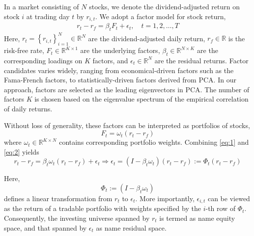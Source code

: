 \documentclass[12pt,article]{memoir}
\begin{document}
%
%
%
%
%
%
%


In a market consisting of $N$ stocks, we denote the dividend-adjusted return on stock $i$ at trading day $t$ by $r_{i, t}$. We adopt a factor model for stock return,
\begin{align}\label{eq:1}
r_t- r_f = \beta_t F_t+ \epsilon_t, \quad t=1,2, \ldots, T 
\end{align}
Here, $r_t=\left\{r_{i, t}\right\}_{i=1}^N \in \mathbb{R}^N$ are the dividend-adjusted daily return, $r_f \in \mathbb{R}$ is the risk-free rate, $F_t \in \mathbb{R}^{K \times 1}$ are the underlying factors, $\beta_t \in \mathbb{R}^{N \times K}$ are the corresponding loadings on $K$ factors, and $\epsilon_t \in \mathbb{R}^N$ are the residual returns. Factor candidates varies widely, ranging from economical-driven factors such as the Fama-French factors, to statistically-driven factors derived from PCA. In our approach, factors are selected as the leading eigenvectors in PCA. The number of factors $K$ is chosen based on the eigenvalue spectrum of the empirical correlation of daily returns.


Without loss of generality, these factors can be interpreted as portfolios of stocks,
\begin{equation}\label{eq:2}
	F_t=\omega_t\left(r_t-r_f\right)
\end{equation}
where $\omega_t \in \mathbb{R}^{K \times N}$ contains corresponding portfolio weights. Combining \cref{eq:1} and \cref{eq:2} yields
\begin{equation}\label{eq:3}
	r_t-r_f=\beta_t \omega_t\left(r_t-r_f\right)+\epsilon_t \Rightarrow \epsilon_t=\left(I-\beta_t \omega_t\right)\left(r_t-r_f\right):=\Phi_t\left(r_t-r_f\right)
\end{equation}

Here,
\begin{equation}\label{eq:4}
	\Phi_t:=\left(I-\beta_t \omega_t\right)
\end{equation}
defines a linear transformation from $r_t$ to $\epsilon_t$. More importantly, $\epsilon_{i, t}$ can be viewed as the return of a tradable portfolio with weights specified by the $i$-th row of $\Phi_t$. Consequently, the investing universe spanned by $r_t$ is termed as name equity space, and that spanned by $\epsilon_t$ as name residual space.
\end{document}
